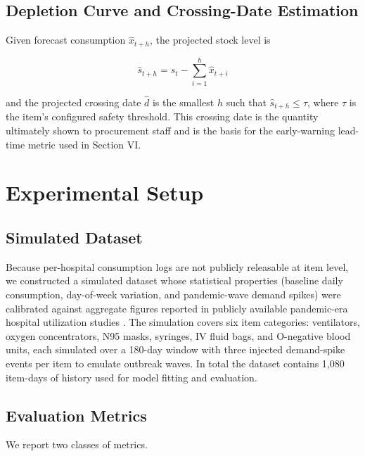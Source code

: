\documentclass[conference]{IEEEtran}
\begin{document}
\subsection{Depletion Curve and Crossing-Date Estimation}

Given forecast consumption $\hat{x}_{t+h}$, the projected stock level is

\begin{equation}
\hat{s}_{t+h} = s_t - \sum_{i=1}^{h} \hat{x}_{t+i}
\label{eq:depletion}
\end{equation}

and the projected crossing date $\hat{d}$ is the smallest $h$ such that $\hat{s}_{t+h} \leq \tau$, where $\tau$ is the item's configured safety threshold. This crossing date is the quantity ultimately shown to procurement staff and is the basis for the early-warning lead-time metric used in Section VI.


\section{Experimental Setup}

\subsection{Simulated Dataset}

Because per-hospital consumption logs are not publicly releasable at item level, we constructed a simulated dataset whose statistical properties (baseline daily consumption, day-of-week variation, and pandemic-wave demand spikes) were calibrated against aggregate figures reported in publicly available pandemic-era hospital utilization studies \cite{b1,b2,b5}. The simulation covers six item categories: ventilators, oxygen concentrators, N95 masks, syringes, IV fluid bags, and O-negative blood units, each simulated over a 180-day window with three injected demand-spike events per item to emulate outbreak waves. In total the dataset contains 1,080 item-days of history used for model fitting and evaluation.

\subsection{Evaluation Metrics}

We report two classes of metrics.
\end{document}
